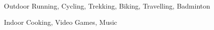 

\begin{cvskills}
  \cvskill
    {Outdoor} %
    {Running, Cycling, Trekking, Biking, Travelling, Badminton} %

  \cvskill
    {Indoor} %
    {Cooking, Video Games, Music} %

\end{cvskills}
